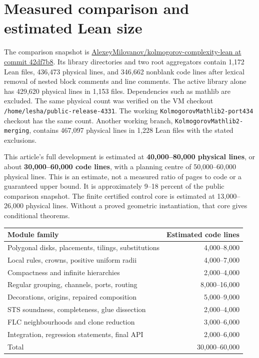\section{Measured comparison and estimated Lean size}

The comparison snapshot is
\href{https://github.com/AlexeyMilovanov/kolmogorov-complexity-lean/tree/42df7b843d6727291dfd0cbc1ceb299723ce5cb6}
{AlexeyMilovanov/kolmogorov-complexity-lean at commit 42df7b8}.
Its library directories and two root aggregators contain 1,172 Lean files,
436,473 physical lines, and 346,662 nonblank code lines after lexical
removal of nested block comments and line comments.
The active library alone has 429,620 physical lines in 1,153 files.
Dependencies such as mathlib are excluded. The same physical count was
verified on the VM checkout \texttt{/home/lesha/public-release-4331}.
The working \texttt{KolmogorovMathlib2-port434} checkout has the same count.
Another working branch, \texttt{KolmogorovMathlib2-merging}, contains 467,097
physical lines in 1,228 Lean files with the stated exclusions.

This article's full development is estimated at \textbf{40,000--80,000
physical lines}, or about \textbf{30,000--60,000 code lines}, with a planning
centre of 50,000--60,000 physical lines. This is an estimate, not a measured
ratio of pages to code or a guaranteed upper bound. It is approximately
9--18 percent of the public comparison snapshot. The finite certified
control core is estimated at 13,000--26,000 physical lines. Without a
proved geometric instantiation, that core gives conditional theorems.

\begin{center}
\begin{tabular}{lr}
Module family & Estimated code lines\\ \hline
Polygonal disks, placements, tilings, substitutions & 4,000--8,000\\
Local rules, crowns, positive uniform radii & 4,000--7,000\\
Compactness and infinite hierarchies & 2,000--4,000\\
Regular grouping, channels, ports, routing & 8,000--16,000\\
Decorations, origins, repaired composition & 5,000--9,000\\
STS soundness, completeness, glue dissection & 2,000--4,000\\
FLC neighbourhoods and clone reduction & 3,000--6,000\\
Integration, regression statements, final API & 2,000--6,000\\ \hline
Total & 30,000--60,000
\end{tabular}
\end{center}

